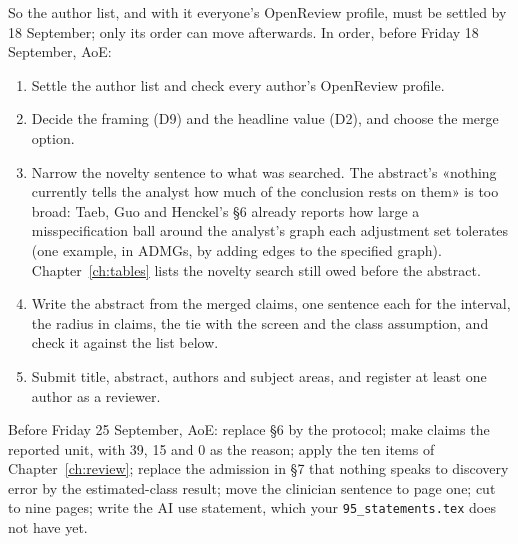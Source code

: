 So the author list, and with it everyone's OpenReview profile, must be settled by 18 September; only its
order can move afterwards. In order, before Friday 18 September, AoE:

\begin{enumerate}[nosep, leftmargin=*]
\item Settle the author list and check every author's OpenReview profile.
\item Decide the framing (D9) and the headline value (D2), and choose the merge option.
\item Narrow the novelty sentence to what was searched. The abstract's «nothing currently tells the analyst
  how much of the conclusion rests on them» is too broad: Taeb, Guo and Henckel's \S6 already reports how
  large a misspecification ball around the analyst's graph each adjustment set tolerates (one example, in
  ADMGs, by adding edges to the specified graph). Chapter~\ref{ch:tables} lists the novelty search still owed
  before the abstract.
\item Write the abstract from the merged claims, one sentence each for the interval, the radius in claims,
  the tie with the screen and the class assumption, and check it against the list below.
\item Submit title, abstract, authors and subject areas, and register at least one author as a reviewer.
\end{enumerate}

\noindent Before Friday 25 September, AoE: replace \S6 by the protocol; make claims the reported unit, with
39, 15 and 0 as the reason; apply the ten items of Chapter~\ref{ch:review}; replace the admission in \S7
that nothing speaks to discovery error by the estimated-class result; move the clinician sentence to page one; cut
to nine pages; write the AI use statement, which your \texttt{95\_statements.tex} does not have yet.

